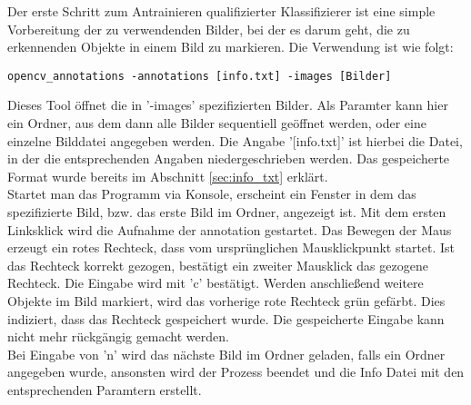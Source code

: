 Der erste Schritt zum Antrainieren qualifizierter Klassifizierer ist eine simple Vorbereitung der zu verwendenden Bilder, bei der es darum geht, die zu erkennenden Objekte in einem Bild zu markieren. Die Verwendung ist wie folgt:
\begin{lstlisting}
opencv_annotations -annotations [info.txt] -images [Bilder]
\end{lstlisting}
Dieses Tool öffnet die in '-images' spezifizierten Bilder. Als Paramter kann hier ein Ordner, aus dem dann alle Bilder sequentiell geöffnet werden, oder eine einzelne Bilddatei angegeben werden. Die Angabe '[info.txt]' ist hierbei die Datei, in der die entsprechenden Angaben niedergeschrieben werden. Das gespeicherte Format wurde bereits im Abschnitt \ref{sec:info_txt} erklärt. \\
Startet man das Programm via Konsole, erscheint ein Fenster in dem das spezifizierte Bild, bzw. das erste Bild im Ordner, angezeigt ist. Mit dem ersten Linksklick wird die Aufnahme der annotation gestartet. Das Bewegen der Maus erzeugt ein rotes Rechteck, dass vom ursprünglichen Mausklickpunkt startet. Ist das Rechteck korrekt gezogen, bestätigt ein zweiter Mausklick das gezogene Rechteck. Die Eingabe wird mit 'c' bestätigt. Werden anschließend weitere Objekte im Bild markiert, wird das vorherige rote Rechteck grün gefärbt. Dies indiziert, dass das Rechteck gespeichert wurde. Die gespeicherte Eingabe kann nicht mehr rückgängig gemacht werden.\\
Bei Eingabe von 'n' wird das nächste Bild im Ordner geladen, falls ein Ordner angegeben wurde, ansonsten wird der Prozess beendet und die Info Datei mit den entsprechenden Paramtern erstellt.